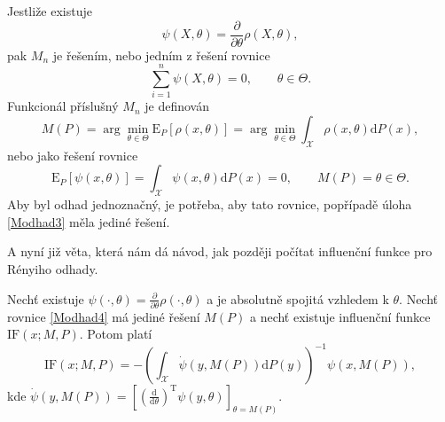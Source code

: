 \noindent Jestliže existuje 
\begin{equation}
	\psi(X,\theta) = \frac{\partial}{\partial \theta} \rho(X,\theta), 
\end{equation}
pak $M_n$ je řešením, nebo jedním z řešení rovnice 
\begin{equation}
	\sum_{i=1}^n \psi(X,\theta) = 0, \qquad \theta \in \Theta.
	\label{Modhad2}
\end{equation}
Funkcionál příslušný $M_n$ je definován 
\begin{equation}
	M(P) = \arg \min_{\theta \in \Theta} \mathrm{E}_{P}\left[ \rho(x,\theta) \right] = \arg \min_{\theta \in \Theta} \int_\mathcal{X} \rho(x,\theta) \mathrm{d}P(x),
	\label{Modhad3}
\end{equation}
nebo jako řešení rovnice 
\begin{equation}
\mathrm{E}_{P}\left[ \psi(x,\theta) \right] =  \int_\mathcal{X} \psi(x,\theta) \mathrm{d}P(x) = 0, \qquad M(P) = \theta \in \Theta.
\label{Modhad4}
\end{equation}
Aby byl odhad jednoznačný, je potřeba, aby tato rovnice, popřípadě úloha \eqref{Modhad3} měla jediné řešení.

A nyní již věta, která nám dá návod, jak později počítat influenční funkce pro Rényiho odhady. 
\begin{theorem} 
 Nechť existuje $\psi(\cdot,\theta) =  \frac{\partial}{\partial \theta} \rho(\cdot,\theta)$ a je absolutně spojitá vzhledem k $\theta$. Nech\v{t} rovnice \eqref{Modhad4} má jediné řešení $M(P)$ a nechť existuje influenční funkce $\mathrm{IF}(x;M,P)$. Potom platí
\begin{equation}
 \text{IF}(x;M,P) = -\left(\int_{\mathcal{X}} \dot{\psi} (y,M(P)) \mathrm{d}P(y)\right)^{-1} \psi(x,M(P)),
\end{equation}
kde $\dot{\psi} (y,M(P)) = \left[\left(\frac{\mathrm{d}}{\mathrm{d}\theta}\right)^\mathrm{T}\psi(y,\theta)\right]_{\theta = M(P)}$.
\label{influencni veta}
\end{theorem}


